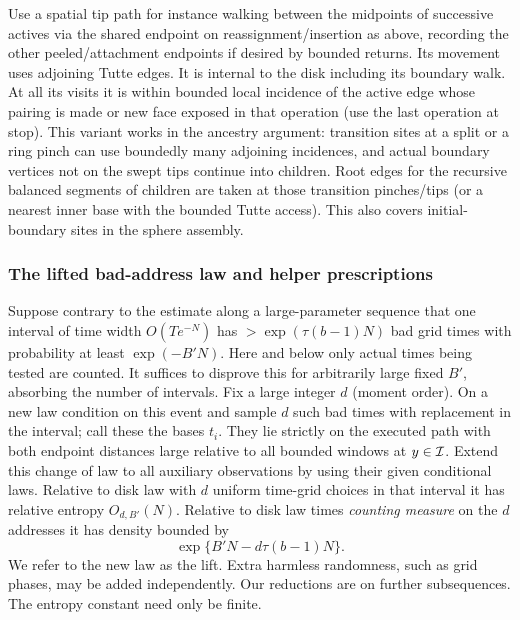 Use a spatial tip path for instance walking between the midpoints of successive actives
via the shared endpoint on reassignment/insertion as above, recording the other
peeled/attachment endpoints if desired by bounded returns. Its movement uses adjoining
Tutte edges. It is internal to the disk including its boundary walk. At all its visits it
is within bounded local incidence of the active edge whose pairing is made or new face
exposed in that operation (use the last operation at stop). This variant works in the
ancestry argument: transition sites at a split or a ring pinch can use boundedly many
adjoining incidences, and actual boundary vertices not on the swept tips continue into
children. Root edges for the recursive balanced segments of children are taken at those
transition pinches/tips (or a nearest inner base with the bounded Tutte access). This also
covers initial-boundary sites in the sphere assembly.

\subsubsection{The lifted bad-address law and helper prescriptions}

Suppose contrary to the estimate along a large-parameter sequence that one interval of
time width \(O(Te^{-N})\) has \(>\exp(\tau(b-1)N)\) bad grid times with probability at
least \(\exp(-B' N)\). Here and below only actual times being tested are counted. It
suffices to disprove this for arbitrarily large fixed \(B'\), absorbing the number of
intervals. Fix a large integer \(d\) (moment order). On a new law condition on this event
and sample \(d\) such bad times with replacement in the interval; call these the bases
\(t_i\). They lie strictly on the executed path with both endpoint distances large
relative to all bounded windows at \(y\in{\cal I}\). Extend this change of law to all
auxiliary observations by using their given conditional laws. Relative to disk law with
\(d\) uniform time-grid choices in that interval it has relative entropy \(O_{d,B'}(N)\).
Relative to disk law times \emph{counting measure} on the \(d\) addresses it has density
bounded by \begin{equation}
\exp\{ B'N-d\tau(b-1)N\}.             \label{eq:original-19}
\end{equation} We refer to the new law as the lift. Extra harmless randomness, such as
grid phases, may be added independently. Our reductions are on further subsequences. The
entropy constant need only be finite.

